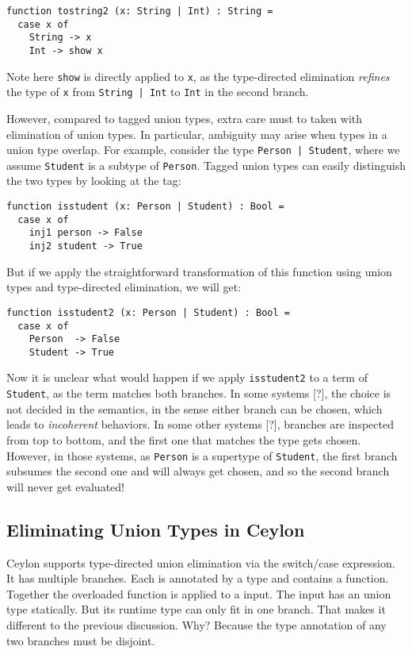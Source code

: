 \begin{lstlisting}
function tostring2 (x: String | Int) : String =
  case x of
    String -> x
    Int -> show x
\end{lstlisting}

\noindent Note here \lstinline{show} is directly applied to \lstinline{x}, as
the type-directed elimination \textit{refines} the type of \lstinline{x} from
\lstinline{String | Int} to \lstinline{Int} in the second branch.

However, compared to tagged union types, extra care must to taken with
elimination of union types. In particular, ambiguity may arise when types in a
union type overlap. For example, consider the type \lstinline{Person | Student},
where we assume \lstinline{Student} is a subtype of \lstinline{Person}. Tagged
union types can easily distinguish the two types by looking at the tag:

\begin{lstlisting}
function isstudent (x: Person | Student) : Bool =
  case x of
    inj1 person -> False
    inj2 student -> True
\end{lstlisting}

But if we apply the straightforward transformation of this function using union
types and type-directed elimination, we will get:

\begin{lstlisting}
function isstudent2 (x: Person | Student) : Bool =
  case x of
    Person  -> False
    Student -> True
\end{lstlisting}

\noindent Now it is unclear what would happen if we apply \lstinline{isstudent2}
to a term of \lstinline{Student}, as the term matches both branches. In some
systems [?], the choice is not decided in the semantics, in the sense either
branch can be chosen, which leads to \textit{incoherent} behaviors. In some
other systems [?], branches are inspected from top to bottom, and the first one
that matches the type gets chosen. However, in those systems, as
\lstinline{Person} is a supertype of \lstinline{Student}, the first branch
subsumes the second one and will always get chosen, and so the second branch
will never get evaluated!


\subsection{Eliminating Union Types in Ceylon}
Ceylon supports type-directed union elimination via the switch/case expression.
It has multiple branches. Each is annotated by a type and contains a function.
Together the overloaded function is applied to a input.
The input has an union type statically.
But its runtime type can only fit in one branch.
That makes it different to the previous discussion. Why?
Because the type annotation of any two branches must be disjoint.

